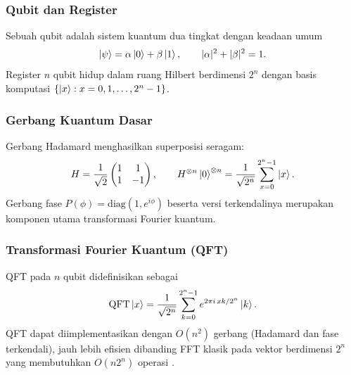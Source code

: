 \documentclass[11pt,a4paper]{article}
\begin{document}
\subsubsection{Qubit dan Register}
Sebuah qubit adalah sistem kuantum dua tingkat dengan keadaan umum
\begin{equation}
  \ket{\psi} = \alpha\ket{0} + \beta\ket{1}, \qquad |\alpha|^2 + |\beta|^2 = 1.
\end{equation}
Register $n$ qubit hidup dalam ruang Hilbert berdimensi $2^n$ dengan basis
komputasi $\{\ket{x} : x = 0, 1, \dots, 2^n - 1\}$.

\subsubsection{Gerbang Kuantum Dasar}
Gerbang Hadamard menghasilkan superposisi seragam:
\begin{equation}
  H = \frac{1}{\sqrt 2}\begin{pmatrix} 1 & 1 \\ 1 & -1 \end{pmatrix},
  \qquad
  H^{\otimes n}\ket{0}^{\otimes n} = \frac{1}{\sqrt{2^n}} \sum_{x=0}^{2^n-1} \ket{x}.
\end{equation}
Gerbang fase $P(\phi) = \mathrm{diag}(1, e^{i\phi})$ beserta versi
terkendalinya merupakan komponen utama transformasi Fourier kuantum.

\subsubsection{Transformasi Fourier Kuantum (QFT)}
QFT pada $n$ qubit didefinisikan sebagai
\begin{equation}
  \mathrm{QFT}\ket{x} = \frac{1}{\sqrt{2^n}} \sum_{k=0}^{2^n-1}
  e^{2\pi i\, x k / 2^n} \ket{k}.
\end{equation}
QFT dapat diimplementasikan dengan $O(n^2)$ gerbang (Hadamard dan fase
terkendali), jauh lebih efisien dibanding FFT klasik pada vektor berdimensi
$2^n$ yang membutuhkan $O(n 2^n)$ operasi \cite{nielsen2010}.
\end{document}
